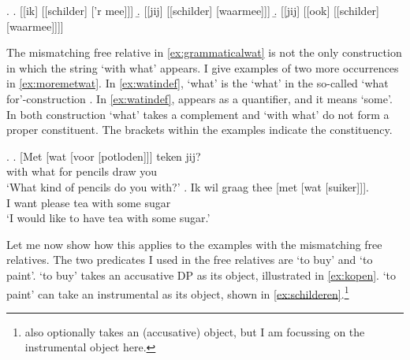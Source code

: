\documentclass[12pt]{article}
\begin{document}
\ex.
\a. [[ik] [[schilder] ['r mee]]]\label{ex:const1stage}
\b. [[jij] [[schilder] [waarmee]]]\label{ex:const2stage}
\b. [[jij] [[ook] [[schilder] [waarmee]]]]\label{ex:const3stage}



The mismatching free relative in \ref{ex:grammaticalwat} is not the only construction in which the string  `with what' appears. I give examples of two more occurrences in \ref{ex:moremetwat}. In \ref{ex:watindef},  `what' is the  `what' in the so-called  `what for'-construction \citep[cf.][]{corver1991}.
In \ref{ex:watindef},  appears as a quantifier, and it means `some'. In both construction  `what' takes a complement and  `with what' do not form a proper constituent. The brackets within the examples indicate the constituency.

\ex.\label{ex:moremetwat}
\ag. [Met [wat [voor [potloden]]] teken jij?\\
 with what for pencils draw you\\
 `What kind of pencils do you with?'\label{ex:watwasfur}
\bg. Ik wil graag thee [met [wat [suiker]]].\\
 I want please tea with some sugar\\
 `I would like to have tea with some sugar.'\label{ex:watindef}

Let me now show how this applies to the examples with the mismatching free relatives. The two predicates I used in the free relatives are  `to buy' and   `to paint'.  `to buy' takes an accusative DP as its object, illustrated in \ref{ex:kopen}.  `to paint' can take an instrumental as its object, shown in \ref{ex:schilderen}.\footnote{ also optionally takes an (accusative) object, but I am focussing on the instrumental object here.}
\end{document}
